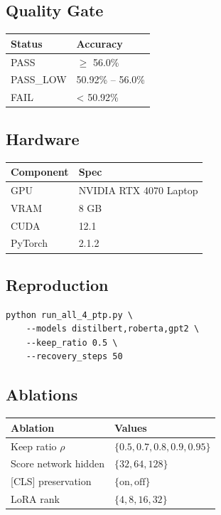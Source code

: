 {\begin{itemize}
\end{itemize}
\subsection{Quality Gate}

\begin{table}[H]
\centering
\small
\begin{tabular}{ll}
\toprule
\textbf{Status} & \textbf{Accuracy} \\
\midrule
PASS & $\ge$ 56.0\% \\
PASS\_LOW & 50.92\% -- 56.0\% \\
FAIL & < 50.92\% \\
\bottomrule
\end{tabular}
\end{table}

\subsection{Hardware}

\begin{table}[H]
\centering
\small
\begin{tabular}{ll}
\toprule
\textbf{Component} & \textbf{Spec} \\
\midrule
GPU & NVIDIA RTX 4070 Laptop \\
VRAM & 8 GB \\
CUDA & 12.1 \\
PyTorch & 2.1.2 \\
\bottomrule
\end{tabular}
\end{table}

\subsection{Reproduction}

\begin{lstlisting}
python run_all_4_ptp.py \
    --models distilbert,roberta,gpt2 \
    --keep_ratio 0.5 \
    --recovery_steps 50
\end{lstlisting}

\subsection{Ablations}

\begin{table}[H]
\centering
\small
\begin{tabular}{ll}
\toprule
\textbf{Ablation} & \textbf{Values} \\
\midrule
Keep ratio $\rho$ & $\{0.5, 0.7, 0.8, 0.9, 0.95\}$ \\
Score network hidden & $\{32, 64, 128\}$ \\
 {[}CLS] preservation & $\{\text{on}, \text{off}\}$ \\
LoRA rank & $\{4, 8, 16, 32\}$ \\
\bottomrule
\end{tabular}
\end{table}




}

